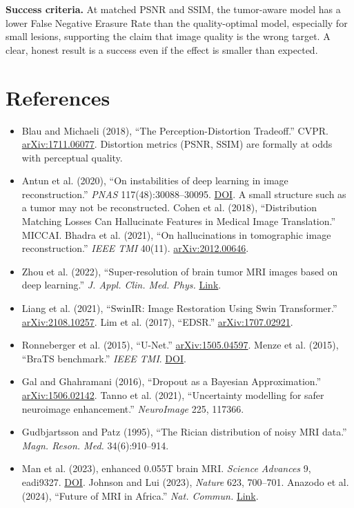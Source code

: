 \documentclass[11pt,a4paper]{article}
\begin{document}
\textbf{Success criteria.} At matched PSNR and SSIM, the tumor-aware model has a lower False Negative Erasure Rate than the quality-optimal model, especially for small lesions, supporting the claim that image quality is the wrong target. A clear, honest result is a success even if the effect is smaller than expected.

\section*{References}

\begin{itemize}\small
  \item Blau and Michaeli (2018), ``The Perception-Distortion Tradeoff.'' CVPR. \href{https://arxiv.org/abs/1711.06077}{arXiv:1711.06077}. Distortion metrics (PSNR, SSIM) are formally at odds with perceptual quality.
  \item Antun et al. (2020), ``On instabilities of deep learning in image reconstruction.'' \textit{PNAS} 117(48):30088--30095. \href{https://doi.org/10.1073/pnas.1907377117}{DOI}. A small structure such as a tumor may not be reconstructed. Cohen et al. (2018), ``Distribution Matching Losses Can Hallucinate Features in Medical Image Translation.'' MICCAI. Bhadra et al. (2021), ``On hallucinations in tomographic image reconstruction.'' \textit{IEEE TMI} 40(11). \href{https://arxiv.org/abs/2012.00646}{arXiv:2012.00646}.
  \item Zhou et al. (2022), ``Super-resolution of brain tumor MRI images based on deep learning.'' \textit{J. Appl. Clin. Med. Phys.} \href{https://aapm.onlinelibrary.wiley.com/doi/full/10.1002/acm2.13758}{Link}.
  \item Liang et al. (2021), ``SwinIR: Image Restoration Using Swin Transformer.'' \href{https://arxiv.org/abs/2108.10257}{arXiv:2108.10257}. Lim et al. (2017), ``EDSR.'' \href{https://arxiv.org/abs/1707.02921}{arXiv:1707.02921}.
  \item Ronneberger et al. (2015), ``U-Net.'' \href{https://arxiv.org/abs/1505.04597}{arXiv:1505.04597}. Menze et al. (2015), ``BraTS benchmark.'' \textit{IEEE TMI}. \href{https://doi.org/10.1109/TMI.2014.2377694}{DOI}.
  \item Gal and Ghahramani (2016), ``Dropout as a Bayesian Approximation.'' \href{https://arxiv.org/abs/1506.02142}{arXiv:1506.02142}. Tanno et al. (2021), ``Uncertainty modelling for safer neuroimage enhancement.'' \textit{NeuroImage} 225, 117366.
  \item Gudbjartsson and Patz (1995), ``The Rician distribution of noisy MRI data.'' \textit{Magn. Reson. Med.} 34(6):910--914.
  \item Man et al. (2023), enhanced 0.055T brain MRI. \textit{Science Advances} 9, eadi9327. \href{https://doi.org/10.1126/sciadv.adi9327}{DOI}. Johnson and Lui (2023), \textit{Nature} 623, 700--701. Anazodo et al. (2024), ``Future of MRI in Africa.'' \textit{Nat. Commun.} \href{https://www.nature.com/articles/s41467-024-46567-3}{Link}.
\end{itemize}
\end{document}
